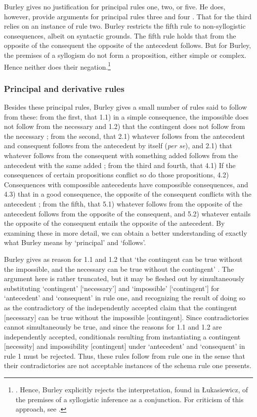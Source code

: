 \documentclass[]{article}
\begin{document}
Burley gives no justification for principal rules one, two, or five. He does, however, provide arguments for principal rules three and four \cite[p. 63.1-14]{BurleyDPAL}. That for the third relies on an instance of rule two. Burley restricts the fifth rule to non-syllogistic consequences, albeit on syntactic grounds. The fifth rule holds that from the opposite of the consequent the opposite of the antecedent follows. But for Burley, the premises of a syllogism do not form a proposition, either simple or complex. Hence neither does their negation.\footnote{\cite[pp. 65.3-17; 207.31-208.9]{BurleyDPAL}. Hence, Burley explicitly rejects the interpretation, found in \L{}ukasiewicz, of the premises of a syllogistic inference as a conjunction\cite{Lukasiewicz1957}. For criticism of this approach, see \cite{Corcoran1974}.}

\subsubsection{Principal and derivative rules}
Besides these principal rules, Burley gives a small number of rules said to follow from these: from the first, that 1.1) in a simple consequence, the impossible does not follow from the necessary and 1.2) that the contingent does not follow from the necessary \cite[p. 62.1-8]{BurleyDPAL}; from the second, that 2.1) whatever follows from the antecedent and consequent follows from the antecedent by itself (\textit{per se}), and 2.1) that whatever follows from the consequent with something added follows from the antecedent with the same added \cite[p. 62.22-38]{BurleyDPAL}; from the third and fourth, that 4.1) If the consequences of certain propositions conflict so do those propositions, 4.2) Consequences with compossible antecedents have compossible consequences, and 4.3) that in a good consequence, the opposite of the consequent conflicts with the antecedent \cite[pp. 63.15-64.7]{BurleyDPAL}; from the fifth, that 5.1) whatever follows from the opposite of the antecedent follows from the opposite of the consequent, and 5.2) whatever entails the opposite of the consequent entails the opposite of the antecedent. By examining these in more detail, we can obtain a better understanding of exactly what Burley means by `principal' and `follows'. 

Burley gives as reason for 1.1 and 1.2 that `the contingent can be true without the impossible, and the necessary can be true without the contingent' \cite[p. 62.5-6]{BurleyDPAL}. The argument here is rather truncated, but it may be fleshed out by simultaneously substituting `contingent' [`necessary'] and `impossible' [`contingent'] for `antecedent' and `consequent' in rule one, and recognizing the result of doing so as the contradictory of the independently accepted claim that the contingent [necessary] can be true without the impossible [contingent]. Since contradictories cannot simultaneously be true, and since the reasons for 1.1 and 1.2 are independently accepted, conditionals resulting from instantiating a contingent [necessity] and impossibility [contingent] under `antecedent' and `consequent' in rule 1 must be rejected. Thus, these rules follow from rule one in the sense that their contradictories are not acceptable instances of the schema rule one presents.
\end{document}
